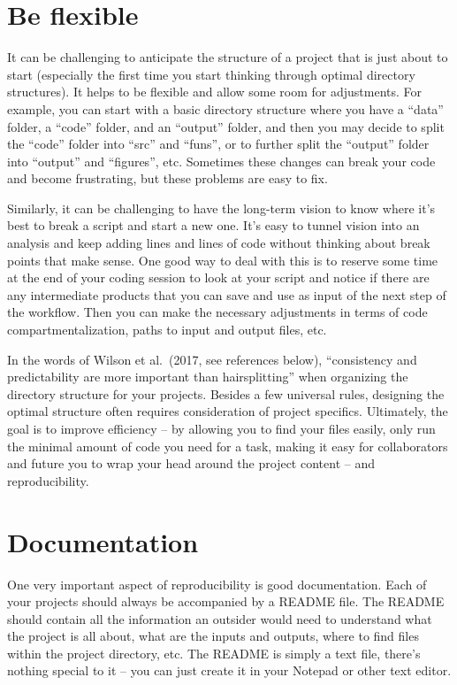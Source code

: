 \documentclass[
]{book}
\begin{document}
\hypertarget{be-flexible}{%
\section{Be flexible}\label{be-flexible}}

It can be challenging to anticipate the structure of a project that is just about to start (especially the first time you start thinking through optimal directory structures). It helps to be flexible and allow some room for adjustments. For example, you can start with a basic directory structure where you have a ``data'' folder, a ``code'' folder, and an ``output'' folder, and then you may decide to split the ``code'' folder into ``src'' and ``funs'', or to further split the ``output'' folder into ``output'' and ``figures'', etc. Sometimes these changes can break your code and become frustrating, but these problems are easy to fix.

Similarly, it can be challenging to have the long-term vision to know where it's best to break a script and start a new one. It's easy to tunnel vision into an analysis and keep adding lines and lines of code without thinking about break points that make sense. One good way to deal with this is to reserve some time at the end of your coding session to look at your script and notice if there are any intermediate products that you can save and use as input of the next step of the workflow. Then you can make the necessary adjustments in terms of code compartmentalization, paths to input and output files, etc.

In the words of Wilson et al.~(2017, see references below), ``consistency and predictability are more important than hairsplitting'' when organizing the directory structure for your projects. Besides a few universal rules, designing the optimal structure often requires consideration of project specifics. Ultimately, the goal is to improve efficiency -- by allowing you to find your files easily, only run the minimal amount of code you need for a task, making it easy for collaborators and future you to wrap your head around the project content -- and reproducibility.

\hypertarget{documentation}{%
\section{Documentation}\label{documentation}}

One very important aspect of reproducibility is good documentation. Each of your projects should always be accompanied by a README file. The README should contain all the information an outsider would need to understand what the project is all about, what are the inputs and outputs, where to find files within the project directory, etc. The README is simply a text file, there's nothing special to it -- you can just create it in your Notepad or other text editor.
\end{document}
